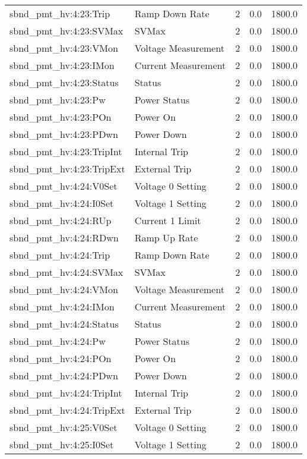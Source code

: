\begin{center}
\begin{longtable}{l | l l l l }
sbnd\_pmt\_hv:4:23:Trip & Ramp Down Rate & 2 & 0.0 & 1800.0\\ 
sbnd\_pmt\_hv:4:23:SVMax & SVMax & 2 & 0.0 & 1800.0\\ 
sbnd\_pmt\_hv:4:23:VMon & Voltage Measurement & 2 & 0.0 & 1800.0\\ 
sbnd\_pmt\_hv:4:23:IMon & Current Measurement & 2 & 0.0 & 1800.0\\ 
sbnd\_pmt\_hv:4:23:Status & Status & 2 & 0.0 & 1800.0\\ 
sbnd\_pmt\_hv:4:23:Pw & Power Status & 2 & 0.0 & 1800.0\\ 
sbnd\_pmt\_hv:4:23:POn & Power On & 2 & 0.0 & 1800.0\\ 
sbnd\_pmt\_hv:4:23:PDwn & Power Down & 2 & 0.0 & 1800.0\\ 
sbnd\_pmt\_hv:4:23:TripInt & Internal Trip & 2 & 0.0 & 1800.0\\ 
sbnd\_pmt\_hv:4:23:TripExt & External Trip & 2 & 0.0 & 1800.0\\ 
sbnd\_pmt\_hv:4:24:V0Set & Voltage 0 Setting & 2 & 0.0 & 1800.0\\ 
sbnd\_pmt\_hv:4:24:I0Set & Voltage 1 Setting & 2 & 0.0 & 1800.0\\ 
sbnd\_pmt\_hv:4:24:RUp & Current 1 Limit & 2 & 0.0 & 1800.0\\ 
sbnd\_pmt\_hv:4:24:RDwn & Ramp Up Rate & 2 & 0.0 & 1800.0\\ 
sbnd\_pmt\_hv:4:24:Trip & Ramp Down Rate & 2 & 0.0 & 1800.0\\ 
sbnd\_pmt\_hv:4:24:SVMax & SVMax & 2 & 0.0 & 1800.0\\ 
sbnd\_pmt\_hv:4:24:VMon & Voltage Measurement & 2 & 0.0 & 1800.0\\ 
sbnd\_pmt\_hv:4:24:IMon & Current Measurement & 2 & 0.0 & 1800.0\\ 
sbnd\_pmt\_hv:4:24:Status & Status & 2 & 0.0 & 1800.0\\ 
sbnd\_pmt\_hv:4:24:Pw & Power Status & 2 & 0.0 & 1800.0\\ 
sbnd\_pmt\_hv:4:24:POn & Power On & 2 & 0.0 & 1800.0\\ 
sbnd\_pmt\_hv:4:24:PDwn & Power Down & 2 & 0.0 & 1800.0\\ 
sbnd\_pmt\_hv:4:24:TripInt & Internal Trip & 2 & 0.0 & 1800.0\\ 
sbnd\_pmt\_hv:4:24:TripExt & External Trip & 2 & 0.0 & 1800.0\\ 
sbnd\_pmt\_hv:4:25:V0Set & Voltage 0 Setting & 2 & 0.0 & 1800.0\\ 
sbnd\_pmt\_hv:4:25:I0Set & Voltage 1 Setting & 2 & 0.0 & 1800.0\\ 

\end{longtable}
\end{center}
